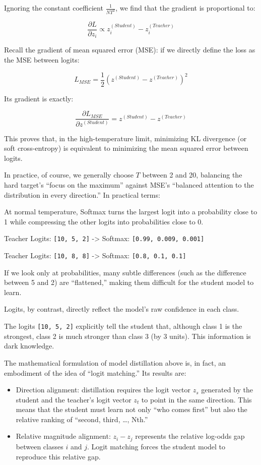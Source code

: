 Ignoring the constant coefficient \(\frac{1}{NT^2}\), we find that the gradient is proportional to:

\[
\frac{\partial L}{\partial z_i} \propto z_i^{(Student)} - z_i^{(Teacher)}
\]

Recall the gradient of mean squared error (MSE): if we directly define the loss as the MSE between logits:

\[
L_{MSE} = \frac{1}{2}\left(z^{(Student)} - z^{(Teacher)}\right)^2
\]

Its gradient is exactly:

\[
\frac{\partial L_{MSE}}{\partial z^{(Student)}} = z^{(Student)} - z^{(Teacher)}
\]

This proves that, in the high-temperature limit, minimizing KL divergence (or soft cross-entropy) is equivalent to minimizing the mean squared error between logits.

In practice, of course, we generally choose \(T\) between 2 and 20, balancing the hard target's ``focus on the maximum'' against MSE's ``balanced attention to the distribution in every direction.'' In practical terms:

At normal temperature, Softmax turns the largest logit into a probability close to 1 while compressing the other logits into probabilities close to 0.

Teacher Logits: \texttt{{[}10,\ 5,\ 2{]}} -\textgreater{} Softmax: \texttt{{[}0.99,\ 0.009,\ 0.001{]}}

Teacher Logits: \texttt{{[}10,\ 8,\ 8{]}} -\textgreater{} Softmax: \texttt{{[}0.8,\ 0.1,\ 0.1{]}}

If we look only at probabilities, many subtle differences (such as the difference between 5 and 2) are ``flattened,'' making them difficult for the student model to learn.

Logits, by contrast, directly reflect the model's raw confidence in each class.

The logits \texttt{{[}10,\ 5,\ 2{]}} explicitly tell the student that, although class 1 is the strongest, class 2 is much stronger than class 3 (by 3 units). This information is dark knowledge.

The mathematical formulation of model distillation above is, in fact, an embodiment of the idea of ``logit matching.'' Its results are:

\begin{itemize}
\tightlist
\item
  Direction alignment: distillation requires the logit vector \(z_s\) generated by the student and the teacher's logit vector \(z_t\) to point in the same direction. This means that the student must learn not only ``who comes first'' but also the relative ranking of ``second, third, \ldots, Nth.''
\item
  Relative magnitude alignment: \(z_i - z_j\) represents the relative log-odds gap between classes \(i\) and \(j\). Logit matching forces the student model to reproduce this relative gap.
\end{itemize}

